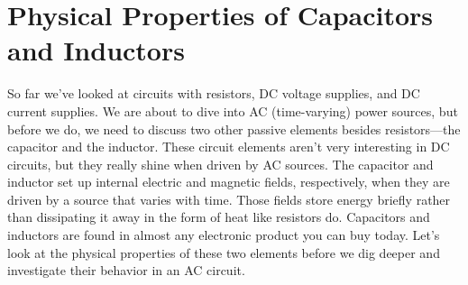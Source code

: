 \chapter{Physical Properties of Capacitors and Inductors}
\label{chap:capInductorProperties}
So far we've looked at circuits with resistors, DC voltage supplies, and DC current supplies. We are about to dive into AC (time-varying) power sources, but before we do, we need to discuss two other passive elements besides resistors---the capacitor and the inductor. These circuit elements aren't very interesting in DC circuits, but they really shine when driven by AC sources. The capacitor and inductor set up internal electric and magnetic fields, respectively, when they are driven by a source that varies with time. Those fields store energy briefly rather than dissipating it away in the form of heat like resistors do. Capacitors and inductors are found in almost any electronic product you can buy today. Let's look at the physical properties of these two elements before we dig deeper and investigate their behavior in an AC circuit.
